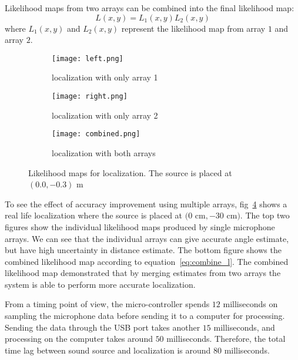 Likelihood maps from two arrays can be combined into the final likelihood map:
\begin{equation}\label{eq:combine_l}
L(x,y) = L_1(x,y) L_2(x,y)
\end{equation}
where $L_1(x,y)$ and $L_2(x,y)$ represent the likelihood map from array $1$ and array $2$.

\begin{figure}[h!]
  \centering
  \begin{subfigure}[]{.48\textwidth}
    \texttt{[image: left.png]}
    \caption{localization with only array 1}
    \label{fig:liklihood1}
  \end{subfigure}
  \begin{subfigure}[]{.48\textwidth}
    \texttt{[image: right.png]}
    \caption{localization with only array 2}
    \label{fig:liklihood2}
  \end{subfigure}
  \begin{subfigure}[]{.48\textwidth}
    \texttt{[image: combined.png]}
    \caption{localization with both arrays}
    \label{fig:liklihood3}
  \end{subfigure}
  \caption{Likelihood maps for localization. The source is placed at $(0.0,-0.3)$ m}
  \label{fig:liklihood}
\end{figure}

To see the effect of accuracy improvement using multiple arrays, fig~\ref{fig:liklihood} shows a real life localization where the source is placed at $(0$ cm$,-30$ cm$)$. The top two figures show the individual likelihood maps produced by single microphone arrays. We can see that the individual arrays can give accurate angle estimate, but have high uncertainty in distance estimate. The bottom figure shows the combined likelihood map according to equation~\ref{eq:combine_l}. The combined likelihood map demonstrated that by merging estimates from two arrays the system is able to perform more accurate localization. 


From a timing point of view, the micro-controller spends $12$ milliseconds on sampling the microphone data before sending it to a computer for processing. Sending the data through the USB port takes another $15$ milliseconds, and processing on the computer takes around $50$ milliseconds. Therefore, the total time lag between sound source and localization is around $80$ milliseconds.
